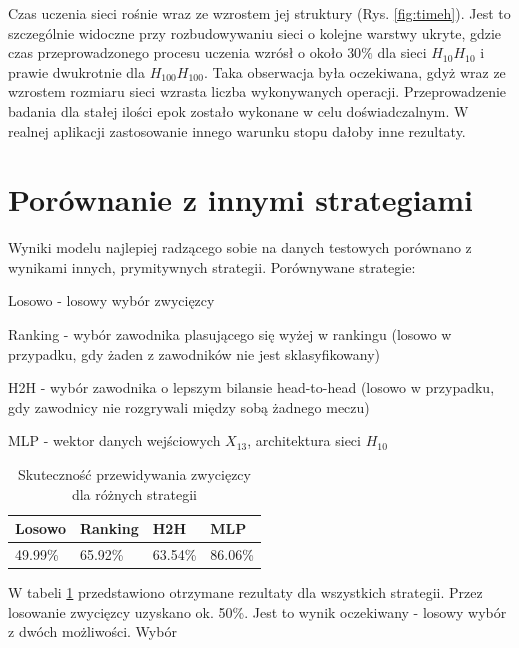 Czas uczenia sieci rośnie wraz ze wzrostem jej struktury (Rys. \ref{fig:timeh}). Jest to szczególnie widoczne przy rozbudowywaniu sieci o kolejne warstwy ukryte, gdzie czas przeprowadzonego procesu uczenia wzrósł o około $30\%$ dla sieci $H_{10}H_{10}$ i prawie dwukrotnie dla $H_{100}H_{100}$. Taka obserwacja była oczekiwana, gdyż wraz ze wzrostem rozmiaru sieci wzrasta liczba wykonywanych operacji. Przeprowadzenie badania dla stałej ilości epok zostało wykonane w celu doświadczalnym. W realnej aplikacji zastosowanie innego warunku stopu dałoby inne rezultaty.

\section{Porównanie z innymi strategiami}
\label{Sec:VsStrat}
Wyniki modelu najlepiej radzącego sobie na danych testowych porównano z wynikami innych, prymitywnych strategii. Porównywane strategie:
\begin{tightitemize}
\item Losowo - losowy wybór zwycięzcy
\item Ranking - wybór zawodnika plasującego się wyżej w rankingu (losowo w przypadku, gdy żaden z zawodników nie jest sklasyfikowany)
\item H2H - wybór zawodnika o lepszym bilansie head-to-head (losowo w przypadku, gdy zawodnicy nie rozgrywali między sobą żadnego meczu)
\item MLP - wektor danych wejściowych $X_{13}$, architektura sieci $H_{10}$
\end{tightitemize}

\begin{table}[H]
\centering
\caption{Skuteczność przewidywania zwycięzcy dla różnych strategii}
\label{tab:scores}
\begin{tabular}{|l|l|l|l|}
\hline
\textbf{Losowo} & \textbf{Ranking} & \textbf{H2H} & \textbf{MLP} \\ \hline
49.99\%          & 65.92\%            & 63.54\%        & 86.06\%        \\ \hline
\end{tabular}
\end{table}

W tabeli \ref{tab:scores} przedstawiono otrzymane rezultaty dla wszystkich strategii. Przez losowanie zwycięzcy uzyskano ok. 50\%. Jest to wynik oczekiwany - losowy wybór z dwóch możliwości. Wybór 

